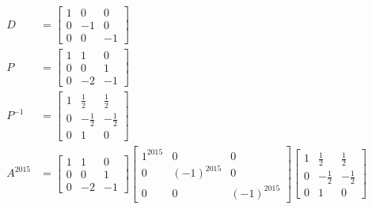 \documentclass{math}
\begin{document}
\begin{align*}
  D &= \begin{bmatrix}
    1 & 0 & 0 \\
    0 & -1 & 0 \\
    0 & 0 & -1
  \end{bmatrix} \\
  P &= \begin{bmatrix}
    1 & 1 & 0 \\
    0 & 0 & 1 \\
    0 & -2 & -1
  \end{bmatrix} \\
  P^{-1} &= \begin{bmatrix}
    1 & \frac{1}{2} & \frac{1}{2} \\
    0 & -\frac{1}{2} & -\frac{1}{2} \\
    0 & 1 & 0
  \end{bmatrix} \\
  A^{2015} &= \begin{bmatrix}
    1 & 1 & 0 \\
    0 & 0 & 1 \\
    0 & -2 & -1
  \end{bmatrix}\begin{bmatrix}
    1^{2015} & 0 & 0 \\
    0 & (-1)^{2015} & 0 \\
    0 & 0 & (-1)^{2015}
  \end{bmatrix}\begin{bmatrix}
    1 & \frac{1}{2} & \frac{1}{2} \\
    0 & -\frac{1}{2} & -\frac{1}{2} \\
    0 & 1 & 0
  \end{bmatrix}
\end{align*}
\end{document}
